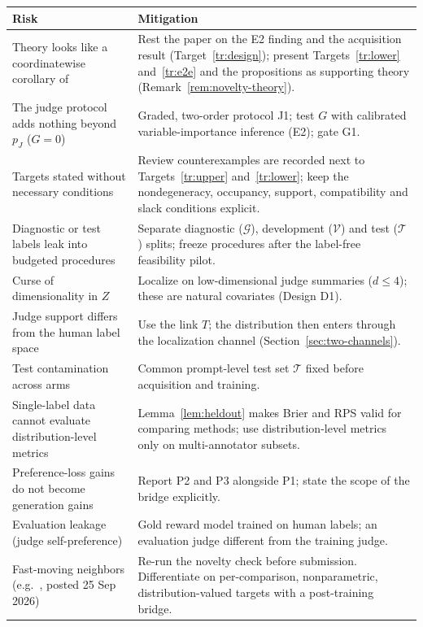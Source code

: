 \begin{center}
\small
\renewcommand{\arraystretch}{1.2}
\begin{tabularx}{\linewidth}{@{}p{4.4cm}X@{}}
\toprule
Risk & Mitigation \\
\midrule
Theory looks like a coordinatewise corollary of \citet{li2026personalizing} &
Rest the paper on the E2 finding and the acquisition result (Target~\ref{tr:design}); present
Targets~\ref{tr:lower} and~\ref{tr:e2e} and the propositions as supporting theory
(Remark~\ref{rem:novelty-theory}). \\
The judge protocol adds nothing beyond $p_J$ ($G=0$) &
Graded, two-order protocol J1; test $G$ with calibrated variable-importance inference (E2); gate G1. \\
Targets stated without necessary conditions &
Review counterexamples are recorded next to Targets~\ref{tr:upper} and~\ref{tr:lower}; keep the
nondegeneracy, occupancy, support, compatibility and slack conditions explicit. \\
Diagnostic or test labels leak into budgeted procedures &
Separate diagnostic ($\mathcal G$), development ($\mathcal V$) and test ($\mathcal T$) splits; freeze
procedures after the label-free feasibility pilot. \\
Curse of dimensionality in $Z$ &
Localize on low-dimensional judge summaries ($d\le4$); these are natural covariates (Design D1). \\
Judge support differs from the human label space &
Use the link $T$; the distribution then enters through the localization channel
(Section~\ref{sec:two-channels}). \\
Test contamination across arms &
Common prompt-level test set $\mathcal T$ fixed before acquisition and training. \\
Single-label data cannot evaluate distribution-level metrics &
Lemma~\ref{lem:heldout} makes Brier and RPS valid for comparing methods; use distribution-level
metrics only on multi-annotator subsets. \\
Preference-loss gains do not become generation gains &
Report P2 and P3 alongside P1; state the scope of the bridge explicitly. \\
Evaluation leakage (judge self-preference) &
Gold reward model trained on human labels; an evaluation judge different from the training judge. \\
Fast-moving neighbors (e.g.\ \citealp{cai2026dial}, posted 25 Sep 2026) &
Re-run the novelty check before submission. Differentiate on per-comparison, nonparametric,
distribution-valued targets with a post-training bridge. \\
\bottomrule
\end{tabularx}
\end{center}

